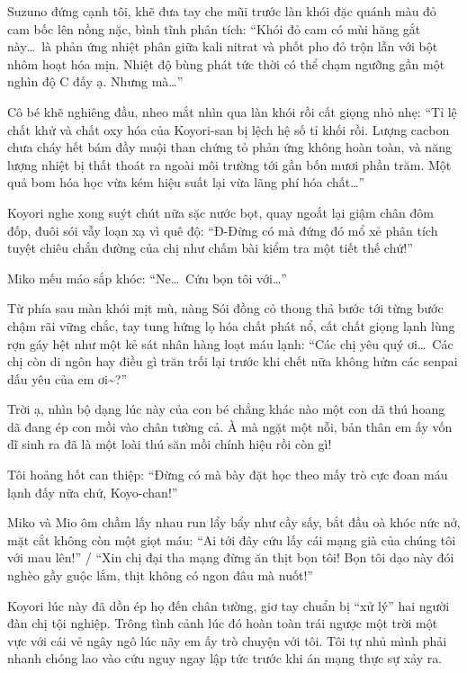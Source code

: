 \documentclass[../main.tex]{subfiles}
\begin{document}
Suzuno đứng cạnh tôi, khẽ đưa tay che mũi trước làn khói đặc quánh màu đỏ cam bốc lên nồng nặc, bình tĩnh phân tích: ``Khói đỏ cam có mùi hăng gắt này\dots\ là phản ứng nhiệt phân giữa kali nitrat và phốt pho đỏ trộn lẫn với bột nhôm hoạt hóa mịn. Nhiệt độ bùng phát tức thời có thể chạm ngưỡng gần một nghìn độ C đấy ạ. Nhưng mà\dots''

Cô bé khẽ nghiêng đầu, nheo mắt nhìn qua làn khói rồi cất giọng nhỏ nhẹ: ``Tỉ lệ chất khử và chất oxy hóa của Koyori-san bị lệch hệ số tỉ khối rồi. Lượng cacbon chưa cháy hết bám đầy muội than chứng tỏ phản ứng không hoàn toàn, và năng lượng nhiệt bị thất thoát ra ngoài môi trường tới gần bốn mươi phần trăm. Một quả bom hóa học vừa kém hiệu suất lại vừa lãng phí hóa chất\dots''

Koyori nghe xong suýt chút nữa sặc nước bọt, quay ngoắt lại giậm chân đôm đốp, đuôi sói vẫy loạn xạ vì quê độ: ``Đ-Đừng có mà đứng đó mổ xẻ phân tích tuyệt chiêu chắn đường của chị như chấm bài kiểm tra một tiết thế chứ!''

Miko mếu máo sắp khóc: ``Ne\dots\ Cứu bọn tôi với\dots''

Từ phía sau màn khói mịt mù, nàng Sói đồng cỏ thong thả bước tới từng bước chậm rãi vững chắc, tay tung hứng lọ hóa chất phát nổ, cất chất giọng lạnh lùng rợn gáy hệt như một kẻ sát nhân hàng loạt máu lạnh: ``Các chị yêu quý ơi\dots\ Các chị còn di ngôn hay điều gì trăn trối lại trước khi chết nữa không hửm các senpai dấu yêu của em ơi\~{}?''


Trời ạ, nhìn bộ dạng lúc này của con bé chẳng khác nào một con dã thú hoang dã đang ép con mồi vào chân tường cả. À mà ngặt một nỗi, bản thân em ấy vốn dĩ sinh ra đã là một loài thú săn mồi chính hiệu rồi còn gì!

Tôi hoảng hốt can thiệp: ``Đừng có mà bày đặt học theo mấy trò cực đoan máu lạnh đấy nữa chứ, Koyo-chan!''

Miko và Mio ôm chầm lấy nhau run lẩy bẩy như cầy sấy, bắt đầu oà khóc nức nở, mặt cắt không còn một giọt máu: ``Ai tới đây cứu lấy cái mạng già của chúng tôi với mau lên!'' / ``Xin chị đại tha mạng đừng ăn thịt bọn tôi! Bọn tôi dạo này đói nghèo gầy guộc lắm, thịt không có ngon đâu mà nuốt!''

Koyori lúc này đã dồn ép họ đến chân tường, giơ tay chuẩn bị ``xử lý'' hai người đàn chị tội nghiệp. Trông tình cảnh lúc đó hoàn toàn trái ngược một trời một vực với cái vẻ ngây ngô lúc nãy em ấy trò chuyện với tôi. Tôi tự nhủ mình phải nhanh chóng lao vào cứu nguy ngay lập tức trước khi án mạng thực sự xảy ra.
\end{document}
